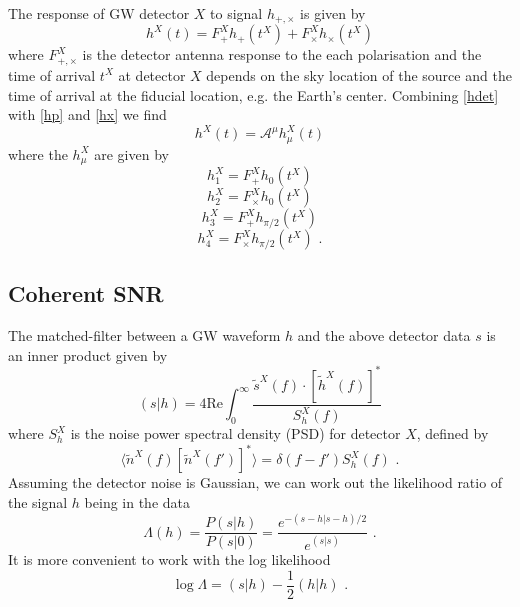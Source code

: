 \documentclass[12pt,twoside,a4paper]{report}
\begin{document}
The response of GW detector $X$ to signal $h_{+,\times}$ is given by
\begin{equation} \label{hdet}
h^X(t) = F_+^X h_+(t^X) + F_\times^X h_\times (t^X)
\end{equation}
where $F_{+,\times}^X$ is the detector antenna response to the each polarisation and the time of arrival $t^X$ at detector $X$ depends on the sky location of the source and the time of arrival at the fiducial location, e.g. the Earth's center. Combining \ref{hdet} with \ref{hp} and \ref{hx} we find
\begin{equation}
h^X(t) = \mathcal{A}^\mu h_\mu^X(t) 
\end{equation}
where the $h_\mu^X$ are given by
\begin{equation}
h_1^X = F_+^X h_0(t^X) 
\end{equation}
\begin{equation}
h_2^X = F_\times^X h_0(t^X) 
\end{equation}
\begin{equation}
h_3^X = F_+^X h_{\pi/2}(t^X) 
\end{equation}
\begin{equation}
h_4^X = F_\times^X h_{\pi/2}(t^X) \textbf{ .} 
\end{equation}

\subsection{Coherent SNR}
The matched-filter between a GW waveform $h$ and the above detector data $s$ is an inner product given by 
\begin{equation}
(s|h) = 4 \text{Re} \int^\infty_0 \frac{\tilde{s}^X(f) \cdot [\tilde{h}^X(f)]^*}{S^X_h (f)}
\end{equation}
where $S^X_h$ is the noise power spectral density (PSD) for detector $X$, defined by
\begin{equation}
\langle \tilde{n}^X(f) [\tilde{n}^X(f')]^* \rangle = \delta (f-f') S^X_h(f) \textbf{ .}
\end{equation} 
Assuming the detector noise is Gaussian, we can work out the likelihood ratio of the signal $h$ being in the data
\begin{equation}
\Lambda (h) = \frac{P(s|h)}{P(s|0)} = \frac{e^{-(s-h|s-h)/2}}{e^{(s|s)}} \textbf{ .}
\end{equation}
It is more convenient to work with the log likelihood 
\begin{equation}
\log \Lambda = (s|h) - \frac{1}{2}(h|h) \textbf{ .}
\end{equation}
\end{document}
